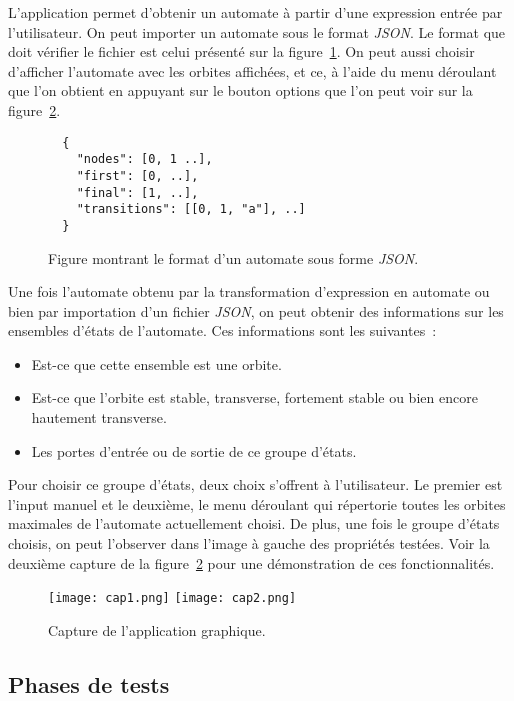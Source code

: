 L'application permet d'obtenir un automate à partir d'une expression entrée
par l'utilisateur. On peut importer un automate sous le format \textit{JSON}. Le
format que doit vérifier le fichier est celui présenté sur la
figure~\ref{fig:jsonFormat}. On peut aussi choisir d'afficher l'automate avec
les orbites affichées, et ce, à l'aide du menu déroulant que l'on obtient en
appuyant sur le bouton options que l'on peut voir sur la
figure~\ref{fig:cap1}.

\begin{figure}[H]
    \begin{verbatim}
  {
    "nodes": [0, 1 ..],
    "first": [0, ..],
    "final": [1, ..],
    "transitions": [[0, 1, "a"], ..] 
  }
  \end{verbatim}
    \caption{Figure montrant le format d'un automate sous forme \textit{JSON}.}
    \label{fig:jsonFormat}
\end{figure}

Une fois l'automate obtenu par la transformation d'expression en automate ou
bien par importation d'un fichier \textit{JSON}, on peut obtenir des
informations sur les ensembles d'états de l'automate. Ces informations sont les
suivantes~:

\begin{itemize}
    \item[\textbullet] Est-ce que cette ensemble est une orbite.
    \item[\textbullet] Est-ce que l'orbite est stable, transverse,
        fortement stable ou bien encore hautement transverse.
    \item[\textbullet] Les portes d'entrée ou de sortie de ce groupe d'états.
\end{itemize}

Pour choisir ce groupe d'états, deux choix s'offrent à l'utilisateur. Le premier
est l'input manuel et le deuxième, le menu déroulant qui répertorie toutes les
orbites maximales de l'automate actuellement choisi. De plus, une fois le
groupe d'états choisis, on peut l'observer dans l'image à gauche des propriétés
testées. Voir la deuxième capture de la figure~\ref{fig:cap1} pour une
démonstration de ces fonctionnalités.

\begin{figure}[H]
    \texttt{[image: cap1.png]}
    \texttt{[image: cap2.png]}
    \caption{Capture de l'application graphique.}\label{fig:cap1}
\end{figure}

\subsection{Phases de tests}

